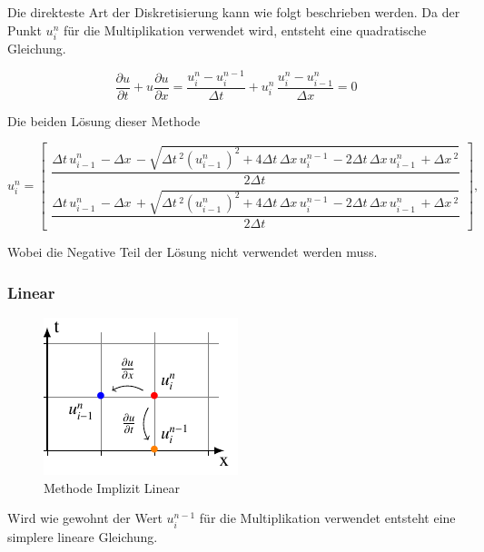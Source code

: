	Die direkteste Art der Diskretisierung kann wie folgt beschrieben werden.
	Da der Punkt $u_{i}^{n}$ f\"ur die Multiplikation verwendet wird, entsteht eine quadratische Gleichung.


\begin{equation}
\frac {\partial u}{\partial t}+u{\frac {\partial u}{\partial x}} = \frac{u_{i}^{n}-u_{i}^{n-1}}{\Delta t}+ u_{i}^{n}\, \frac{u_{i}^{n}-u_{i-1}^{n}}{\Delta x}=0
\end{equation}

	Die beiden L\"osung dieser Methode

\begin{equation}
  u_{i}^{n} = \begin{bmatrix}
     \dfrac{\Delta{t}\, u^{n}_{i-1}\, - \Delta{x}\, - \sqrt{\Delta{t}\,^{2} \left(u^{n}_{i-1}\,\right)^{2} + 4 \Delta{t}\, \Delta{x}\, u^{n-1}_{i}\, - 2 \Delta{t}\, \Delta{x}\, u^{n}_{i-1}\, + \Delta{x}\,^{2}}}{2 \Delta{t}\,} \\[15pt]
     \dfrac{\Delta{t}\, u^{n}_{i-1}\, - \Delta{x}\, + \sqrt{\Delta{t}\,^{2} \left(u^{n}_{i-1}\,\right)^{2} + 4 \Delta{t}\, \Delta{x}\, u^{n-1}_{i}\, - 2 \Delta{t}\, \Delta{x}\, u^{n}_{i-1}\, + \Delta{x}\,^{2}}}{2 \Delta{t}\,}
  \end{bmatrix},
\end{equation}

	Wobei die Negative Teil der L\"osung nicht verwendet werden muss.

\subsubsection{Linear}
     \begin{figure}[!ht]
	\centering
	\includegraphics[height=.4\textwidth]{papers/burgers/BurgersEquation/tikz/linear5/linear5.pdf}
	\caption{Methode Implizit Linear}
	\label{burgers:fig:linear5}
	\end{figure}
	
	Wird wie gewohnt der Wert  $u_{i}^{n-1}$ f\"ur die Multiplikation verwendet entsteht eine simplere lineare Gleichung.
	
